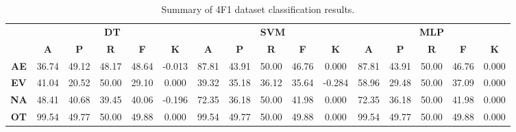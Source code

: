 \begin{landscape}
\begin{table}[htbp]
\footnotesize
\centering
\caption{Summary of 4F1 dataset classification results.}
\label{tab:base_female}
\begin{tabular}{|c|c|c|c|c|c|c|c|c|c|c|c|c|c|c|c|}
\hline
\multirow{2}{*}{}	& \multicolumn{5}{c|}{\textbf{DT}}												& \multicolumn{5}{c|}{\textbf{SVM}}												& \multicolumn{5}{c|}{\textbf{MLP}}												\\ \cline{2-16} 
					& \textbf{A}	& \textbf{P}	& \textbf{R}	& \textbf{F}	& \textbf{K}	& \textbf{A}	& \textbf{P}	& \textbf{R}	& \textbf{F}	& \textbf{K}	& \textbf{A}	& \textbf{P}	& \textbf{R}	& \textbf{F}	& \textbf{K}	\\ \hline

\textbf{AE}			& 36.74			& 49.12			& 48.17			& 48.64			& -0.013			& 87.81			& 43.91			& 50.00			& 46.76			& 0.000			& 87.81			& 43.91			& 50.00			& 46.76			& 0.000			\\ \hline
\textbf{EV}			& 41.04			& 20.52			& 50.00			& 29.10			& 0.000			& 39.32			& 35.18			& 36.12			& 35.64			& -0.284			& 58.96			& 29.48			& 50.00			& 37.09			& 0.000			\\ \hline
\textbf{NA}			& 48.41			& 40.68			& 39.45			& 40.06			& -0.196			& 72.35			& 36.18			& 50.00			& 41.98			& 0.000			& 72.35			& 36.18			& 50.00			& 41.98			& 0.000			\\ \hline
\textbf{OT}			& 99.54			& 49.77			& 50.00			& 49.88			& 0.000			& 99.54			& 49.77			& 50.00			& 49.88			& 0.000			& 99.54			& 49.77			& 50.00			& 49.88			& 0.000			\\ \hline
\end{tabular}
\end{table}
\end{landscape}